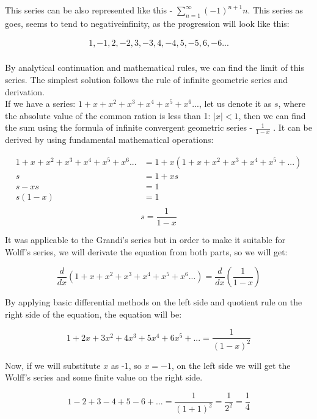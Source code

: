 \documentclass{beamer}
\begin{document}
This series can be also represented like this - $\sum_{n=1}^\infty (-1)^{n+1}n$. This series as goes, seems to tend to negativeinfinity,
as the progression will look like this:

\begin{align*}
1, -1, 2, -2, 3, -3, 4, -4, 5, -5, 6, -6...\\
\end{align*}

By analytical continuation and mathematical rules, we can find the limit of this series. The simplest
solution follows the rule of infinite geometric series and derivation.\\

If we have a series: $1+x+x^2+x^3+x^4+x^5+x^6...$, let us denote it as $s$, where the absolute value of the common
ration is less than 1: $|x| < 1$, then we can find the sum using the formula of infinite convergent
geometric series - $\frac{1}{1-x}$ . It can be derived by using fundamental mathematical operations:

\begin{align*}
  1+x+x^2+x^3+x^4+x^5+x^6...&=1+x(1+x+x^2+x^3+x^4+x^5+...)\\
  s&=1+xs\\
  s-xs&=1\\
  s(1-x)&=1\\
\end{align*}
\begin{equation}
  s=\frac{1}{1-x}
  \end{equation}

It was applicable to the Grandi's series but in order to make it suitable for Wolff's series, we will
derivate the equation from both parts, so we will get:

\begin{equation*}
  \frac{d}{dx}(1+x+x^2+x^3+x^4+x^5+x^6...)=\frac{d}{dx}(\frac{1}{1-x})
  \end{equation*}

By applying basic differential methods on the left side and quotient rule on the right side of the
equation, the equation will be:

\begin{equation*}
  1+2x+3x^2+4x^3+5x^4+6x^5+...=\frac{1}{(1-x)^2}
  \end{equation*}

Now, if we will substitute $x$ as -1, so $x = − 1$, on the left side we will get the Wolff's series and
some finite value on the right side.

\begin{equation}
  1-2+3-4+5-6+...=\frac{1}{(1+1)^2}=\frac{1}{2^2}=\frac{1}{4}
  \label{Wolff}
\end{equation}
\end{document}
